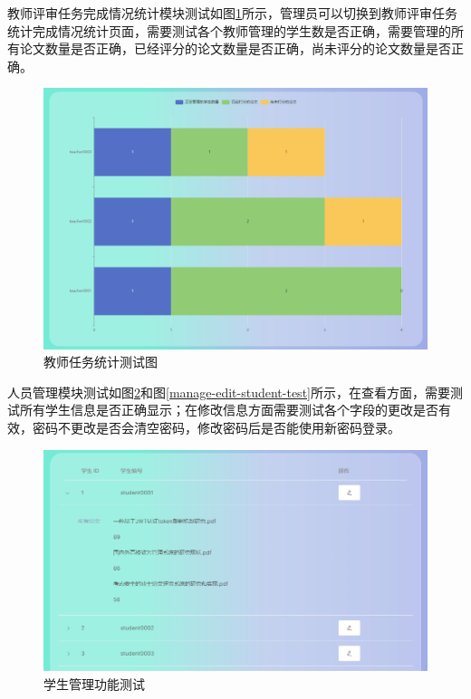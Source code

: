 教师评审任务完成情况统计模块测试如图\ref{statistic-teacher-task-test}所示，管理员可以切换到教师评审任务统计完成情况统计页面，需要测试各个教师管理的学生数是否正确，需要管理的所有论文数量是否正确，已经评分的论文数量是否正确，尚未评分的论文数量是否正确。

\begin{figure}[htbp]
  \centering
  \includegraphics[scale = 0.48]{out/figure/测试/statistic-teacher-task-test.png}
  \caption{\song\wuhao 教师任务统计测试图}
  \label{statistic-teacher-task-test}
\end{figure}

人员管理模块测试如图\ref{manage-students}和图\ref{manage-edit-student-test}所示，在查看方面，需要测试所有学生信息是否正确显示；在修改信息方面需要测试各个字段的更改是否有效，密码不更改是否会清空密码，修改密码后是否能使用新密码登录。

\begin{figure}
  \centering
  \includegraphics[scale = 0.6]{out/figure/测试/manage-students.png}
  \caption{\song\wuhao 学生管理功能测试}
  \label{manage-students}
\end{figure}

